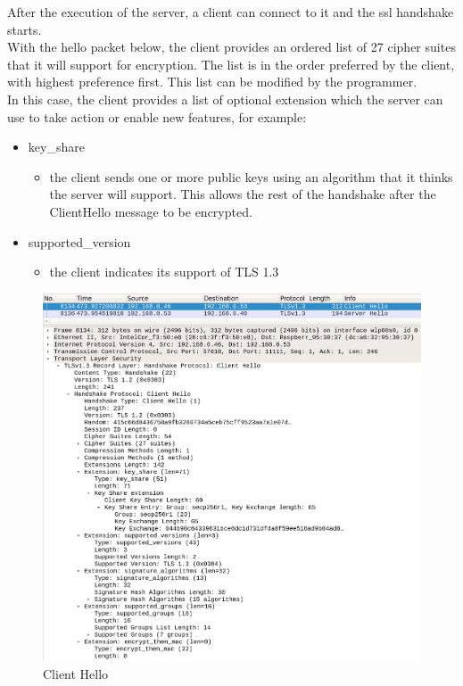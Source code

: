 \documentclass[a4paper,12pt]{report}
\begin{document}
After the execution of the server, a client can connect to it and the ssl handshake starts.
\\With the hello packet below, the client provides an ordered list of 27 cipher suites that it will support for encryption. The list is in the order preferred by the client, with highest preference first. This list can be modified by the programmer.
\\In this case, the client provides a list of optional extension which the server can use to take action or enable new features, for example:
\begin{itemize}
\item key\_share 
\begin{itemize}
\item the client sends one or more public keys using an algorithm that it thinks the server will support. This allows the rest of the handshake after the ClientHello message to be encrypted.
\end{itemize}
\item supported\_version
\begin{itemize}
\item the client indicates its support of TLS 1.3
\end{itemize}
\end{itemize}
\begin{figure}[H]
    \centering
    \includegraphics[scale=0.248]{./code/img/client-hello.png}
    \caption{Client Hello}
    
\end{figure}
\end{document}
